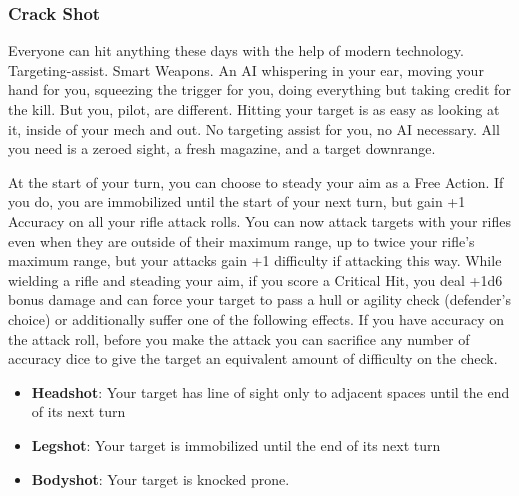 \subsubsection{Crack Shot}

\begin{talent}
{Everyone can hit anything these days with the help of modern technology. Targeting-assist. Smart Weapons. An AI whispering in your ear, moving your hand for you, squeezing the trigger for you, doing everything but taking credit for the kill. But you, pilot, are different. Hitting your target is as easy as looking at it, inside of your mech and out. No targeting assist for you, no AI necessary. All you need is a zeroed sight, a fresh magazine, and a target downrange.}

At the start of your turn, you can choose to steady your aim as a Free Action. If you do, you are immobilized until the start of your next turn, but gain +1 Accuracy on all your rifle attack rolls.
You can now attack targets with your rifles even when they are outside of their maximum range, up to twice your rifle’s maximum range, but your attacks gain +1 difficulty if attacking this way. 
While wielding a rifle and steading your aim, if you score a Critical Hit, you deal +1d6 bonus damage and can force your target to pass a hull or agility check (defender’s choice) or additionally suffer one of the following effects. If you have accuracy on the attack roll, before you make the attack you can sacrifice any number of accuracy dice to give the target an equivalent amount of difficulty on the check.
\begin{itemize}
\item \textbf{Headshot}: Your target has line of sight only to adjacent spaces until the end of its next turn 
\item \textbf{Legshot}: Your target is immobilized until the end of its next turn 
\item \textbf{Bodyshot}: Your target is knocked prone.
\end{itemize}
\end{talent}
